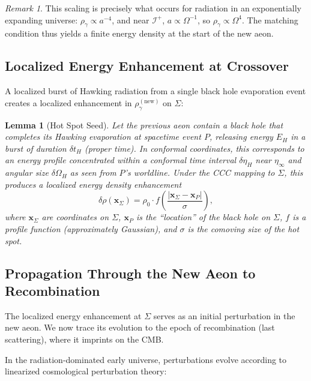 \documentclass[11pt,a4paper]{article}
\theoremstyle{plain}
\newtheorem{lemma}[theorem]{Lemma}
\theoremstyle{definition}
\theoremstyle{remark}
\newtheorem{remark}[theorem]{Remark}
\newcommand{\scriplus}{\mathcal{I}^+}
\begin{document}
\begin{remark}
This scaling is precisely what occurs for radiation in an exponentially expanding universe: $\rho_\gamma \propto a^{-4}$, and near $\scriplus$, $a \propto \Omega^{-1}$, so $\rho_\gamma \propto \Omega^4$. The matching condition thus yields a finite energy density at the start of the new aeon.
\end{remark}

\subsection{Localized Energy Enhancement at Crossover}

A localized burst of Hawking radiation from a single black hole evaporation event creates a localized enhancement in $\rho_\gamma^{(\text{new})}$ on $\Sigma$:

\begin{lemma}[Hot Spot Seed]\label{lem:hot_spot}
Let the previous aeon contain a black hole that completes its Hawking evaporation at spacetime event $P$, releasing energy $E_H$ in a burst of duration $\delta t_H$ (proper time). In conformal coordinates, this corresponds to an energy profile concentrated within a conformal time interval $\delta\eta_H$ near $\eta_\infty$ and angular size $\delta\Omega_H$ as seen from $P$'s worldline. Under the CCC mapping to $\Sigma$, this produces a localized energy density enhancement
\begin{equation}\label{eq:delta_rho}
    \delta\rho(\bm{x}_\Sigma) = \rho_0 \cdot f\left(\frac{|\bm{x}_\Sigma - \bm{x}_P|}{\sigma}\right),
\end{equation}
where $\bm{x}_\Sigma$ are coordinates on $\Sigma$, $\bm{x}_P$ is the ``location'' of the black hole on $\Sigma$, $f$ is a profile function (approximately Gaussian), and $\sigma$ is the comoving size of the hot spot.
\end{lemma}

\subsection{Propagation Through the New Aeon to Recombination}

The localized energy enhancement at $\Sigma$ serves as an initial perturbation in the new aeon. We now trace its evolution to the epoch of recombination (last scattering), where it imprints on the CMB.

In the radiation-dominated early universe, perturbations evolve according to linearized cosmological perturbation theory:
\end{document}
